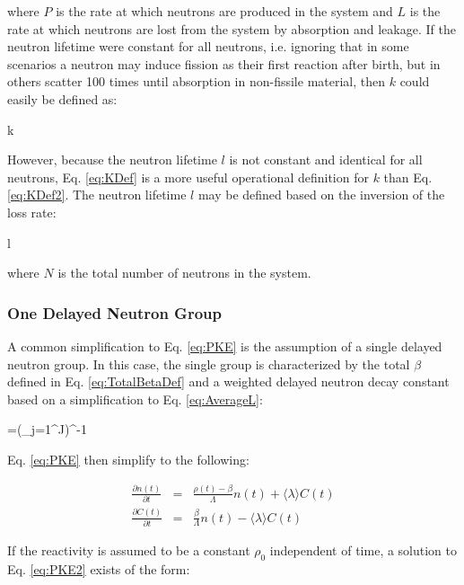 where \(P\) is the rate at which neutrons are produced in the system and \(L\) is the rate at which neutrons are lost from the system by absorption and leakage. If the neutron lifetime were constant for all neutrons, i.e. ignoring that in some scenarios a neutron may induce fission as their first reaction after birth, but in others scatter 100 times until absorption in non-fissile material, then \(k\) could easily be defined as:

\beq
\label{eq:KDef2}
k\equiv{}
\eeq

However, because the neutron lifetime \(l\) is not constant and identical for all neutrons, Eq. \eqref{eq:KDef} is a more useful operational definition for \(k\) than Eq. \eqref{eq:KDef2}. The neutron lifetime \(l\) may be defined based on the inversion of the loss rate:

\beq
\label{eq:NeutronLifetime}
l\equiv{}
\eeq

where \(N\) is the total number of neutrons in the system.

\subsubsection{One Delayed Neutron Group}
A common simplification to Eq. \eqref{eq:PKE} is the assumption of a single delayed neutron group. In this case, the single group is characterized by the total \(\beta\) defined in Eq. \eqref{eq:TotalBetaDef} and a weighted delayed neutron decay constant based on a simplification to Eq. \eqref{eq:AverageL}:

\beq
\langle\lambda\rangle=\left(\sum_{j=1}^J\right)^{-1}
\eeq

Eq. \eqref{eq:PKE} then simplify to the following:

\begin{subequations}
\label{eq:PKE2}
\begin{eqnarray}
\frac{\partial n(t)}{\partial t}&=&\frac{\rho(t)-\beta}{\Lambda}n(t)+\langle\lambda\rangle C(t)\\
\frac{\partial C(t)}{\partial t}&=&\frac{\beta}{\Lambda}n(t)-\langle\lambda\rangle C(t)
\end{eqnarray}
\end{subequations}

If the reactivity is assumed to be a constant \(\rho_0\) independent of time, a solution to Eq. \eqref{eq:PKE2} exists of the form:

